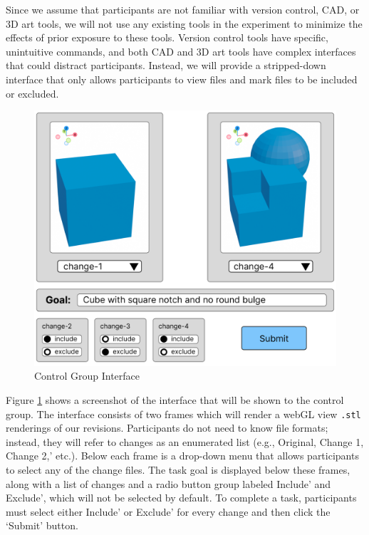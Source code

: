 \documentclass[sigconf,authorversion,nonacm]{acmart}
\begin{document}
Since we assume that participants are not familiar with version control, CAD, or 3D art tools, we will not use any existing tools in the experiment to minimize the effects of prior exposure to these tools.
Version control tools have specific, unintuitive commands, and both CAD and 3D art tools have complex interfaces that could distract participants.
Instead, we will provide a stripped-down interface that only allows participants to view files and mark files to be included or excluded.


\begin{figure}[h]
	\includegraphics[width=\linewidth]{controlgroup.png}
	\caption{Control Group Interface}
	\label{fig:controlgroup}
\end{figure}

Figure \ref{fig:controlgroup} shows a screenshot of the interface that will be shown to the control group.
The interface consists of two frames which will render a webGL view \texttt{.stl} renderings of our revisions.
Participants do not need to know file formats; instead, they will refer to changes as an enumerated list (e.g., Original, Change 1, Change 2,' etc.).
Below each frame is a drop-down menu that allows participants to select any of the change files.
The task goal is displayed below these frames, along with a list of changes and a radio button group labeled Include' and Exclude', which will not be selected by default.
To complete a task, participants must select either Include' or Exclude' for every change and then click the `Submit' button.
\end{document}
